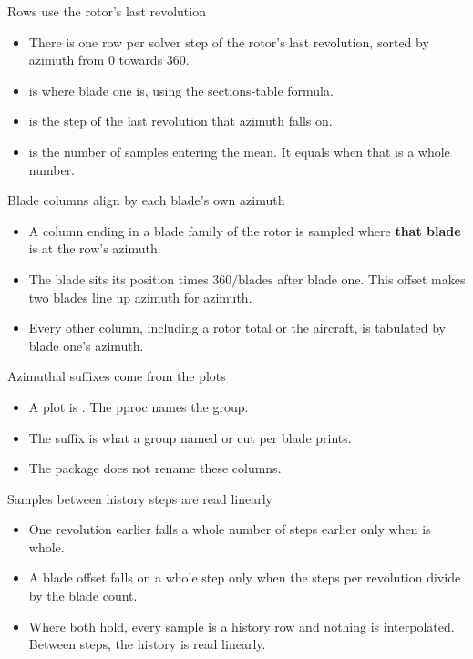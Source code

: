 \begin{frame}{Rows use the rotor's last revolution}
\begin{itemize}
  \item There is one row per solver step of the rotor's last revolution,
        sorted by azimuth from 0 towards 360.
  \item {} is where blade one is, using the sections-table formula.
  \item {} is the step of the last revolution that azimuth falls on.
  \item {} is the number of samples entering the mean.
        It equals  when that is a whole number.
\end{itemize}
\end{frame}

\begin{frame}{Blade columns align by each blade's own azimuth}
\begin{itemize}\small
  \item A column ending in a blade family of the rotor is sampled where
        \textbf{that blade} is at the row's azimuth.
  \item The blade sits its position times $360/\mathrm{blades}$ after blade one.
        This offset makes two blades line up azimuth for azimuth.
  \item Every other column, including a rotor total or the aircraft, is
        tabulated by blade one's azimuth.
\end{itemize}
\end{frame}

\begin{frame}{Azimuthal suffixes come from the plots}
\begin{itemize}\small
  \item A plot is . The pproc names the group.
  \item The suffix 
        is what a group named  or cut per blade prints.
  \item The package does not rename these columns.
\end{itemize}
\end{frame}

\begin{frame}{Samples between history steps are read linearly}
\begin{itemize}
  \item One revolution earlier falls a whole number of steps earlier only
        when  is whole.
  \item A blade offset falls on a whole step only when the steps per
        revolution divide by the blade count.
  \item Where both hold, every sample is a history row and nothing is
        interpolated. Between steps, the history is read linearly.
\end{itemize}
\end{frame}

